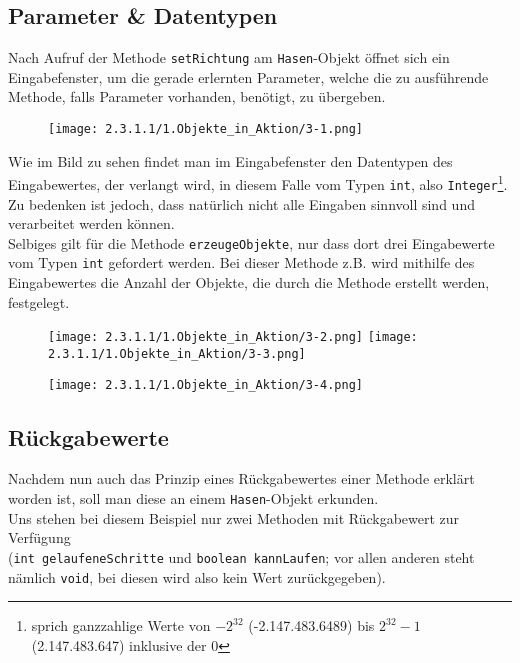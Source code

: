 \documentclass[]{scrartcl}   %
\begin{document}
\subsection{Parameter \& Datentypen}
Nach Aufruf der Methode \texttt{setRichtung} am \texttt{Hasen}-Objekt öffnet sich ein Eingabefenster, um die gerade erlernten Parameter, welche die zu ausführende Methode, falls Parameter vorhanden, benötigt, zu übergeben.

\begin{figure}[ht]
	\centering
	\texttt{[image: 2.3.1.1/1.Objekte\_in\_Aktion/3-1.png]}
\end{figure}

Wie im Bild zu sehen findet man im Eingabefenster den Datentypen des Eingabewertes, der verlangt wird, in diesem Falle vom Typen \texttt{int}, also \texttt{Integer}\footnote{sprich ganzzahlige Werte von $-2^{32}$ (-2.147.483.6489) bis $2^{32} -1$ (2.147.483.647) inklusive der 0}. Zu bedenken ist jedoch, dass natürlich nicht alle Eingaben sinnvoll sind und verarbeitet werden können.\\
Selbiges gilt für die Methode \texttt{erzeugeObjekte}, nur dass dort drei Eingabewerte vom Typen \texttt{int} gefordert werden. Bei dieser Methode z.B. wird mithilfe des Eingabewertes die Anzahl der Objekte, die durch die Methode erstellt werden, festgelegt.

\begin{figure}[ht]
	\centering
	\texttt{[image: 2.3.1.1/1.Objekte\_in\_Aktion/3-2.png]}
	\hspace{0.5cm}
	\texttt{[image: 2.3.1.1/1.Objekte\_in\_Aktion/3-3.png]}
\end{figure}

\vspace{0.5cm}

\begin{figure}[ht]
	\centering
	\texttt{[image: 2.3.1.1/1.Objekte\_in\_Aktion/3-4.png]}
\end{figure}

\subsection{Rückgabewerte}
Nachdem nun auch das Prinzip eines Rückgabewertes einer Methode erklärt worden ist, soll man diese an einem \texttt{Hasen}-Objekt erkunden.\\
Uns stehen bei diesem Beispiel nur zwei Methoden mit Rückgabewert zur Verfügung\\
(\texttt{int gelaufeneSchritte} und \texttt{boolean kannLaufen}; vor allen anderen steht nämlich \texttt{void}, bei diesen wird also kein Wert zurückgegeben).
\end{document}
